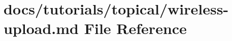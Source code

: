 \hypertarget{wireless-upload_8md}{}\section{docs/tutorials/topical/wireless-\/upload.md File Reference}
\label{wireless-upload_8md}
